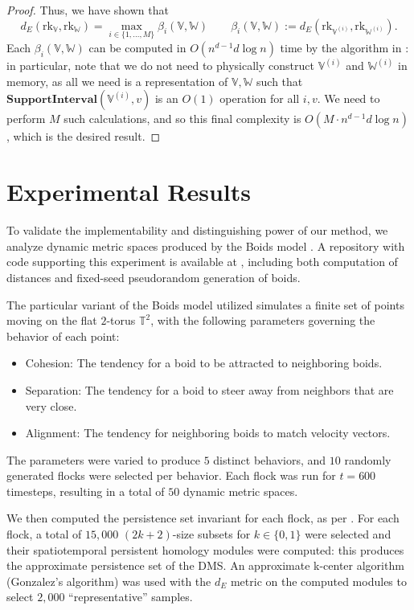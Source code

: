 \documentclass[a4paper,UKenglish,thm-restate]{article}
\theoremstyle{definition}
\def\bbv{\mathbb{V}}
\def\bbw{\mathbb{W}}
\begin{document}
\begin{proof}
                Thus, we have shown that \[d_E(\mathrm{rk}_\bbv, \mathrm{rk}_\bbw) = \max_{i \in \{1, \ldots, M\}} \beta_i(\bbv, \bbw) \qquad \beta_i(\bbv, \bbw) := d_E(\mathrm{rk}_{\bbv^{(i)}}, \mathrm{rk}_{\bbw^{(i)} }).\]
                Each $\beta_i(\bbv, \bbw)$ can be computed in $O(n^{d-1} d \log{n})$ time by the algorithm in : in particular, note that we do not need to physically construct $\bbv^{(i)}$ and $\bbw^{(i)}$ in memory, as all we need is a representation of $\bbv, \bbw$ such that $\mathbf{SupportInterval}(\bbv^{(i)}, v)$ is an $O(1)$ operation for all $i, v$. We need to perform $M$ such calculations, and so this final complexity is $O(M \cdot n^{d-1} d \log{n})$, which is the desired result.
            \end{proof}
            
\section{Experimental Results} \label{sect:experimental}
    To validate the implementability and distinguishing power of our method, we analyze dynamic metric spaces produced by the Boids model \cite{boidsmodel}. A repository with code supporting this experiment is available at \cite{dyncurvrepo}, including both computation of distances and fixed-seed pseudorandom generation of boids.
    
    The particular variant of the Boids model utilized simulates a finite set of points moving on the flat $2$-torus $\mathbb{T}^2$, with the following parameters governing the behavior of each point:
    
    \begin{itemize}
        \item Cohesion: The tendency for a boid to be attracted to neighboring boids.
        \item Separation: The tendency for a boid to steer away from neighbors that are very close. 
        \item Alignment: The tendency for neighboring boids to match velocity vectors.
    \end{itemize}
    
    The parameters were varied to produce $5$ distinct behaviors, and $10$ randomly generated flocks were selected per behavior. Each flock was run for $t=600$ timesteps, resulting in a total of $50$ dynamic metric spaces.

    We then computed the persistence set invariant for each flock, as per . For each flock, a total of $15,000$ $(2k+2)$-size subsets for $k \in \{0, 1\}$ were selected and their spatiotemporal persistent homology modules were computed: this produces the approximate persistence set of the DMS. An approximate k-center algorithm (Gonzalez's algorithm) was used with the $d_E$ metric on the computed modules to select $2,000$ ``representative'' samples.
    
\end{document}
